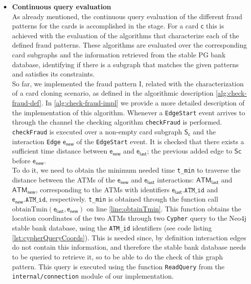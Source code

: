 \begin{itemize}
    \item \textbf{Continuous query evaluation}\\
    As already mentioned, the continuous query evaluation of the different fraud patterns for the cards is accomplished in the \filter stage. For a card $\mathsf{c}$ this is achieved with the evaluation of the algorithms that characterize each of the defined fraud patterns. These algorithms are evaluated over the corresponding card subgraphs and the information retrieved from the stable PG bank database, identifying if there is a subgraph that matches the given patterns and satisfies its constraints.\\
    
    So far, we implemented the fraud pattern I, related with the characterization of a card cloning scenario, as defined in the algorithmic description \ref{alg:check-fraud-def}. 
    In \ref{alg:check-fraud-impl} we provide a more detailed description of the implementation of this algorithm. Whenever a \texttt{EdgeStart} event arrives to \FW through the \internaledgech channel the checking algorithm \texttt{checkFraud} is performed. \texttt{checkFraud} is executed over a non-empty card subgraph $\mathsf{S_c}$ and the interaction \texttt{Edge} $\mathsf{e_{new}}$ of the \texttt{EdgeStart} event. It is checked that there exists a sufficient time distance between $\mathsf{e_{new}}$ and $\mathsf{e_{last}}$; the previous added edge to $\mathsf{Sc}$ before $\mathsf{e_{new}}$.\\
    
    To do it, we need to obtain the minimum needed time \texttt{t\_min} to traverse the distance between the ATMs of the $\mathsf{e_{new}}$ and $\mathsf{e_{last}}$ interactions: $\mathsf{ATM_{last}}$ and $\mathsf{ATM_{new}}$, corresponding to the ATMs with identifiers $\mathsf{e_{last}}.\texttt{ATM\_id}$ and $\mathsf{e_{new}}.\texttt{ATM\_id}$, respectively. \texttt{t\_min} is obtained through the function call $\text{obtainTmin}(\mathsf{e_{last}}, \mathsf{e_{new}})$ on line \ref{line:obtainTmin}. This function obtains the location coordinates of the two ATMs through two \texttt{Cypher} query to the Neo4j stable bank database, using the \texttt{ATM\_id} identifiers (see code listing \ref{lst:cypherQueryCoords}). This is needed since, by definition interaction edges do not contain this information, and therefore the stable bank database needs to be queried to retrieve it, so to be able to do the check of this graph pattern. This query is executed using the function \texttt{ReadQuery} from the \texttt{internal/connection} module of our \DPATM implementation.


\end{itemize}
